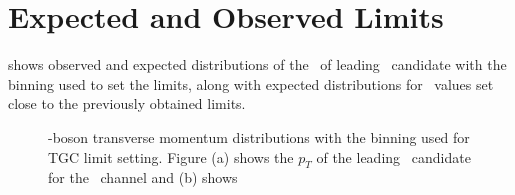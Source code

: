 \section{Expected and Observed Limits}
\label{sec:TGC-ExpObsLimits}

 shows observed and expected distributions of the \pt\ of
leading \Z\ candidate with the binning used to set the limits, along with
expected distributions for \TGC\ values set close to the previously obtained
limits.

\begin{figure}[htbp]
\begin{center}
\caption[\Z-boson transverse momentum distributions with the binning used for
TGC limit setting.]
{\Z-boson transverse momentum distributions with the binning used for
TGC limit setting.
Figure (a) shows the $p_T$ of the leading \Z\ candidate for the \ZZllll\ channel and (b) shows
}
\end{center}
\end{figure}
